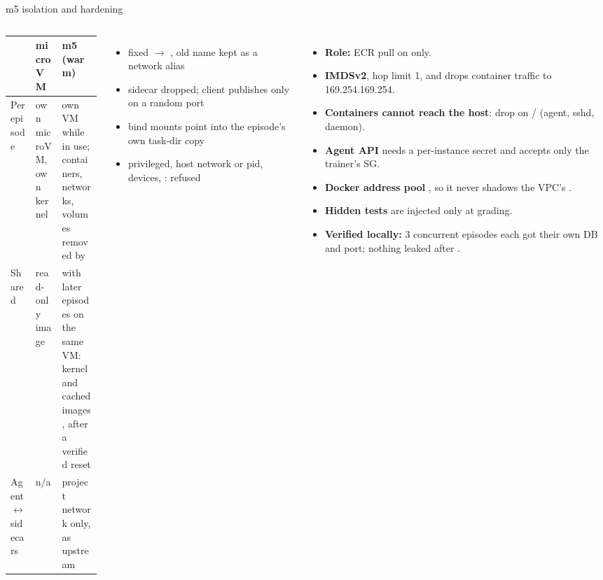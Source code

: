 \begin{frame}{m5 isolation and hardening}
\begin{columns}[T]
\tiny\setlength{\tabcolsep}{3pt}
\begin{tabularx}{\linewidth}{@{}P{0.22\linewidth}YY@{}}
\toprule
& \textbf{\textcolor{cat2}{microVM}} & \textbf{\textcolor{cat1}{m5 (warm)}}\\
\midrule
Per episode & own microVM, own kernel & own VM while in use; containers, networks, volumes removed by \\
Shared & read-only image & with later episodes on the same VM: kernel and cached images, after a verified reset\\
Agent $\leftrightarrow$ sidecars & n/a & project network only, as upstream\\
\bottomrule
\end{tabularx}
\par\vspace{2mm}
\tiny
\begin{itemize}\setlength{\itemsep}{0.4mm}
\item fixed  $\rightarrow$ , old name kept as a network alias
\item sidecar  dropped; client publishes only  on a random port
\item {} bind mounts point into the episode's own task-dir copy
\item privileged, host network or pid, devices, : refused
\end{itemize}
\begin{itemize}\tiny\setlength{\itemsep}{0.8mm}
\item \textbf{Role:} ECR pull on  only.
\item \textbf{IMDSv2}, hop limit 1, and  drops container traffic to 169.254.169.254.
\item \textbf{Containers cannot reach the host}:  drop on / (agent, sshd, daemon).
\item \textbf{Agent API} needs a per-instance secret and accepts only the trainer's SG.
\item \textbf{Docker address pool} , so it never shadows the VPC's .
\item \textbf{Hidden tests} are injected only at grading.
\item \textbf{Verified locally:} 3 concurrent  episodes each got their own DB and port; nothing leaked after .
\end{itemize}
\end{columns}
\end{frame}

